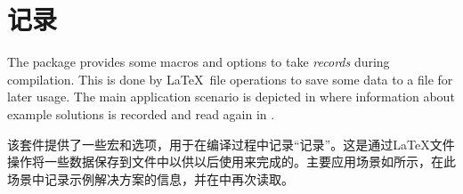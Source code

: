 \setcounter{section}{7}
\section{记录}\label{sec:recording}%
%
\begin{stripedbox}
The package provides some macros and options to take \emph{records} during compilation. 
This is done by \LaTeX\ file operations to save some data to a file for later usage. 
The main application scenario is depicted in  where information about example solutions is recorded and read again in .
\tcblower

该套件提供了一些宏和选项，用于在编译过程中记录“记录”。这是通过\LaTeX 文件操作将一些数据保存到文件中以供以后使用来完成的。主要应用场景如所示，在此场景中记录示例解决方案的信息，并在中再次读取。
\end{stripedbox}


